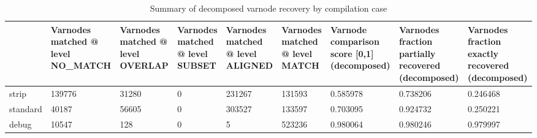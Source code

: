 \begin{table}[t]
\centering
\caption{Summary of decomposed varnode recovery by compilation case}
\label{table:opts-varnodes-summary}
\begin{tabular}{lp{2.2cm}p{2.2cm}p{2.2cm}p{2.2cm}p{2.2cm}p{2.2cm}p{2.2cm}p{2.2cm}}
\toprule
{} &  Varnodes matched @ level NO\_MATCH &  Varnodes matched @ level OVERLAP &  Varnodes matched @ level SUBSET &  Varnodes matched @ level ALIGNED &  Varnodes matched @ level MATCH &  Varnode comparison score [0,1] (decomposed) &  Varnodes fraction partially recovered (decomposed) &  Varnodes fraction exactly recovered (decomposed) \\
\midrule
strip    &                             139776 &                             31280 &                                0 &                            231267 &                          131593 &                                     0.585978 &                                           0.738206 &                                          0.246468 \\
standard &                              40187 &                             56605 &                                0 &                            303527 &                          133597 &                                     0.703095 &                                           0.924732 &                                          0.250221 \\
debug    &                              10547 &                               128 &                                0 &                                 5 &                          523236 &                                     0.980064 &                                           0.980246 &                                          0.979997 \\
\bottomrule
\end{tabular}
\end{table}
